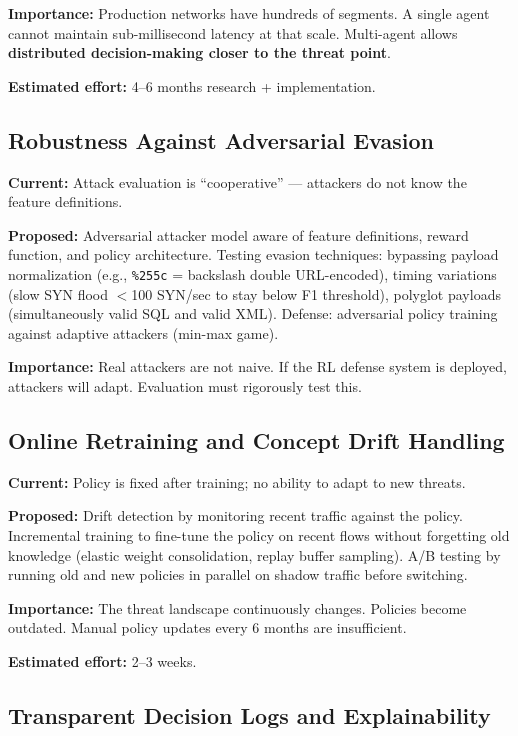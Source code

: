 \documentclass[12pt,a4paper]{report}
\begin{document}
\textbf{Importance:} Production networks have hundreds of segments. A single agent cannot maintain sub-millisecond latency at that scale. Multi-agent allows \textbf{distributed decision-making closer to the threat point}.

\textbf{Estimated effort:} 4--6 months research + implementation.

\subsection{Robustness Against Adversarial Evasion}

\textbf{Current:} Attack evaluation is ``cooperative'' --- attackers do not know the feature definitions.

\textbf{Proposed:} Adversarial attacker model aware of feature definitions, reward function, and policy architecture. Testing evasion techniques: bypassing payload normalization (e.g., \texttt{\%255c} = backslash double URL-encoded), timing variations (slow SYN flood $<$100 SYN/sec to stay below F1 threshold), polyglot payloads (simultaneously valid SQL and valid XML). Defense: adversarial policy training against adaptive attackers (min-max game).

\textbf{Importance:} Real attackers are not naive. If the RL defense system is deployed, attackers will adapt. Evaluation must rigorously test this.

\subsection{Online Retraining and Concept Drift Handling}

\textbf{Current:} Policy is fixed after training; no ability to adapt to new threats.

\textbf{Proposed:} Drift detection by monitoring recent traffic against the policy. Incremental training to fine-tune the policy on recent flows without forgetting old knowledge (elastic weight consolidation, replay buffer sampling). A/B testing by running old and new policies in parallel on shadow traffic before switching.

\textbf{Importance:} The threat landscape continuously changes. Policies become outdated. Manual policy updates every 6 months are insufficient.

\textbf{Estimated effort:} 2--3 weeks.

\subsection{Transparent Decision Logs and Explainability}
\end{document}
